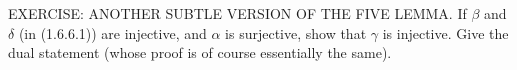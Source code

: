 EXERCISE: ANOTHER SUBTLE VERSION OF THE FIVE LEMMA. If $\beta$ and $\delta$ (in (1.6.6.1)) are injective, and $\alpha$ is surjective, show that $\gamma$ is injective. Give the dual statement (whose proof is of course essentially the same).
